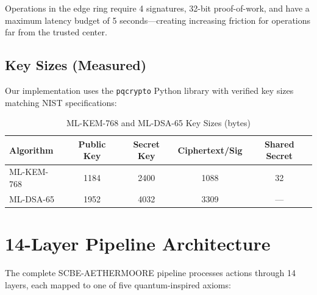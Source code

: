 \documentclass[11pt,a4paper]{article}
\begin{document}
Operations in the edge ring require 4 signatures, 32-bit proof-of-work,
and have a maximum latency budget of 5 seconds---creating increasing
friction for operations far from the trusted center.

\subsection{Key Sizes (Measured)}

Our implementation uses the \texttt{pqcrypto} Python library with
verified key sizes matching NIST specifications:

\begin{table}[h]
\centering
\caption{ML-KEM-768 and ML-DSA-65 Key Sizes (bytes)}
\label{tab:keysizes}
\begin{tabular}{@{}lcccc@{}}
\toprule
\textbf{Algorithm} & \textbf{Public Key} & \textbf{Secret Key} & \textbf{Ciphertext/Sig} & \textbf{Shared Secret} \\
\midrule
ML-KEM-768 & 1184 & 2400 & 1088 & 32 \\
ML-DSA-65  & 1952 & 4032 & 3309 & --- \\
\bottomrule
\end{tabular}
\end{table}

\section{14-Layer Pipeline Architecture}
\label{sec:pipeline}

The complete SCBE-AETHERMOORE pipeline processes actions through 14
layers, each mapped to one of five quantum-inspired axioms:
\end{document}
